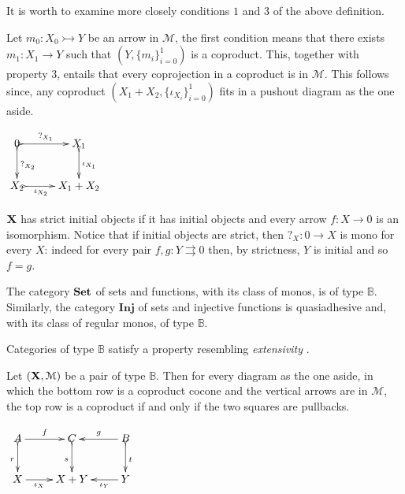 \documentclass[a4paper,UKenglish,cleveref,pdftex, thm-restate,numberwithinsect,anonymous]{lipics}
\def\X{\textbf {\textup{X}}}
\def\Set{\textbf {\textup{Set}}}
\begin{document}
\begin{remark}
	It is worth to examine more closely conditions $1$ and $3$ of the above definition.
	\smallskip 
	\begin{itemize}
	\parbox{10.3cm}{\item Let $m_0\colon X_0 \rightarrowtail Y$ be an arrow in $\mathcal{M}$, the first condition means that there exists $m_1\colon X_1\to Y$ such that $(Y, \{m_i\}_{i=0}^1)$ is a coproduct. This, together with property $3$, entails that every coprojection in a coproduct is in $\mathcal{M}$. This follows since, any coproduct $(X_1+X_2, \{\iota_{X_i}\}_{i=0}^1)$ fits in a pushout diagram as the one aside.}
	  \parbox{3cm}{\vspace{-0em}$\xymatrix@C=25pt{0  \ar@{>->}[r]^-{?_{X_1}} \ar@{>->}[d]^{?_{X_2}}& X_1 \ar@{>->}[d]^{\iota_{X_1}}\\ X_2 \ar@{>->}[r]_-{\iota_{X_2}} & X_1+X_2}$}
		
	\smallskip 	\noindent 
	\parbox{13.5cm}{\item $\X$ has strict initial objects if it has initial objects and every arrow $f:X\to 0$ is an isomorphism. Notice that if initial objects are strict, then $?_X\colon 0\to X$ is mono for every $X$: indeed for every pair $f,g\colon Y\rightrightarrows 0$ then, by strictness, $Y$ is initial and so $f=g$.}
	\end{itemize} 
\end{remark}

\begin{example}
The category $\Set$ of sets and functions, with its class of monos, is of type $\mathbb{B}$. Similarly, the category $\textbf{Inj}$ of sets and injective functions is quasiadhesive and, with its class of regular monos, of type $\mathbb{B}$. 
\end{example}

Categories of type $\mathbb{B}$ satisfy a property resembling \emph{extensivity} \cite{carboni1993introduction}.

\noindent
\parbox{10cm}{\begin{proposition}\label{prop:ext}
Let $(\X, \mathcal{M})$ be a pair of type $\mathbb{B}$. Then for every diagram as the one aside, in which the bottom row is a coproduct cocone and the vertical arrows are in $\mathcal{M}$, the top row is a coproduct if and only if the two squares are pullbacks.
\end{proposition}}
\parbox{2cm}{\vspace{-.4em}$\xymatrix{A\ar[r]^-{f} \ar@{>->}[d]_{r}& C  \ar@{>->}[d]_{s}& B \ar@{>->}[d]^{t}\ar[l]_-{g}\\X  \ar[r]_-{\iota_X}& X+Y & Y \ar[l]^-{\iota_Y}}$}
\end{document}

